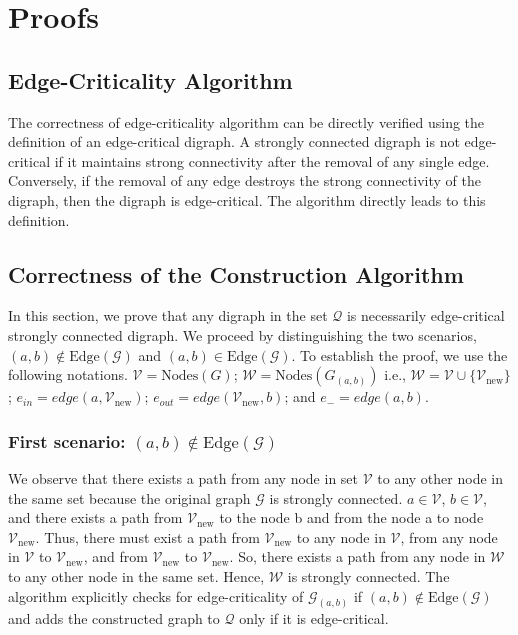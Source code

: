 \documentclass[runningheads]{llncs}
\begin{document}
\section{Proofs}

\subsection{Edge-Criticality Algorithm}
The correctness of edge-criticality algorithm can be directly verified using the definition of an edge-critical digraph. A strongly connected digraph is not edge-critical if it maintains strong connectivity after the removal of any single edge. Conversely, if the removal of any edge destroys the strong connectivity of the digraph, then the digraph is edge-critical. The algorithm directly leads to this definition.

\subsection{Correctness of the Construction Algorithm}
In this section, we prove that any digraph in the set $\mathcal{Q}$ is necessarily edge-critical strongly connected digraph. We proceed by distinguishing the two scenarios, $(a, b) \notin \text{Edge}(\mathcal{G})$ and $(a, b) \in \text{Edge}(\mathcal{G})$. To establish the proof, we use the following notations. $\mathcal{V} = \text{Nodes}(G)$; $\mathcal{W} = \text{Nodes}(G_{(a,b)})$ i.e., $\mathcal{W} = \mathcal{V} \cup \{\mathcal{V}_{\text{new}}\}$; $e_{in} = edge (a, \mathcal{V}_{\text{new}})$; $e_{out} = edge (\mathcal{V}_{\text{new}}, b)$; and $e_{-} = edge (a, b)$.

\subsubsection{First scenario: $(a, b) \notin \text{Edge}(\mathcal{G})$} We observe that there exists a path from any node in set $\mathcal{V}$ to any other node in the same set because the original graph $\mathcal{G}$ is strongly connected. $a \in \mathcal{V}$, $b \in \mathcal{V}$, and there exists a path from $\mathcal{V}_{\text{new}}$ to the node b and from the node a to node $\mathcal{V}_{\text{new}}$. Thus, there must exist a path from $\mathcal{V}_{\text{new}}$ to any node in $\mathcal{V}$, from any node in $\mathcal{V}$ to $\mathcal{V}_{\text{new}}$, and from $\mathcal{V}_{\text{new}}$ to $\mathcal{V}_{\text{new}}$. So, there exists a path from any node in $\mathcal{W}$ to any other node in the same set. Hence, $\mathcal{W}$ is strongly connected.
The algorithm explicitly checks for edge-criticality of $\mathcal{G}_{(a,b)}$ if $(a, b) \notin \text{Edge}(\mathcal{G})$ and adds the constructed graph to $\mathcal{Q}$ only if it is edge-critical.
\end{document}
